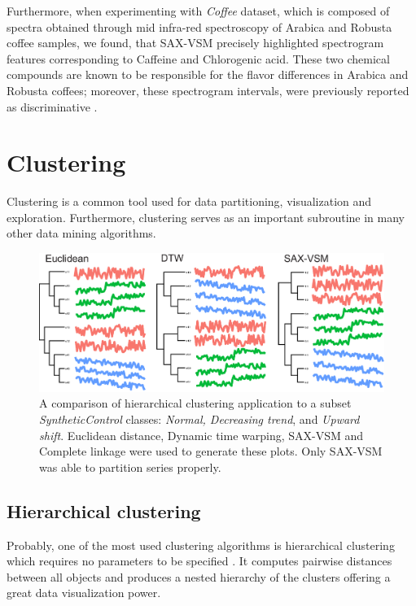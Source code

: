 \documentclass{llncs}
\newcommand{\myfigureshrinker}{\vspace{-1cm}}
\begin{document}
Furthermore, when experimenting with \textit{Coffee} dataset, which is composed of spectra obtained
through mid infra-red spectroscopy of Arabica and Robusta coffee samples, we found, that SAX-VSM
precisely highlighted spectrogram features corresponding to Caffeine and Chlorogenic acid. These two
chemical compounds are known to be responsible for the flavor differences in Arabica and Robusta
coffees; moreover, these spectrogram intervals, were previously reported as discriminative
\cite{coffee}.

\section{Clustering}
Clustering is a common tool used for data partitioning, visualization and exploration. Furthermore, 
clustering serves as an important subroutine in many other data mining algorithms.
\begin{figure}[t]
   \myfigureshrinker
   \centering
   \includegraphics[width=115mm]{figures/clustering.eps}
   \caption{A comparison of hierarchical clustering application to a subset 
\textit{SyntheticControl} classes: \textit{Normal, Decreasing trend}, and \textit{Upward shift}. 
Euclidean distance, Dynamic time warping, SAX-VSM and Complete linkage were used to 
generate these plots. Only SAX-VSM was able to partition series properly.                           
   }
   \label{fig:hc}
\end{figure}

\subsection{Hierarchical clustering}
Probably, one of the most used clustering algorithms is hierarchical clustering which requires no
parameters to be specified \cite{hcs}. It computes pairwise distances between all objects and 
produces a nested hierarchy of the clusters offering a great data visualization power. 
\end{document}
